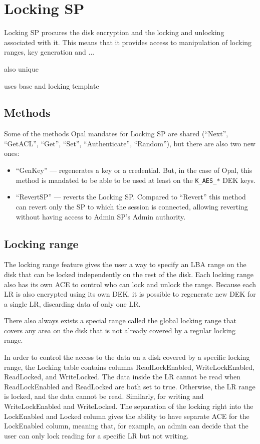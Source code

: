 \section{Locking SP}

Locking SP procures the disk encryption and the locking and unlocking associated with it. This means that it provides access to manipulation of locking ranges, key generation and ...

also unique

uses base and locking template

\subsection{Methods}
Some of the methods Opal mandates for Locking SP are shared (``Next'', ``GetACL'', ``Get'', ``Set'', ``Authenticate'', ``Random''), but there are also two new ones:
\begin{itemize}
\item ``GenKey'' --- regenerates a key or a credential. But, in the case of Opal, this method is mandated to be able to be used at least on the \verb|K_AES_*| DEK keys.
\item ``RevertSP'' --- reverts the Locking SP. Compared to ``Revert'' this method can revert only the SP to which the session is connected, allowing reverting without having access to Admin SP's Admin authority.
\end{itemize}

\subsection{Locking range}

The locking range feature gives the user a way to specify an LBA range on the disk that can be locked independently on the rest of the disk. Each locking range also has its own ACE to control who can lock and unlock the range. Because each LR is also encrypted using its own DEK, it is possible to regenerate new DEK for a single LR, discarding data of only one LR.


There also always exists a special range called the global locking range that covers any area on the disk that is not already covered by a regular locking range.

In order to control the access to the data on a disk covered by a specific locking range, the Locking table contains columns ReadLockEnabled, WriteLockEnabled, ReadLocked, and WriteLocked. The data inside the LR cannot be read when ReadLockEnabled and ReadLocked are both set to true. Otherwise, the LR range is locked, and the data cannot be read. Similarly, for writing and WriteLockEnabled and WriteLocked. The separation of the locking right into the LockEnabled and Locked column gives the ability to have separate ACE for the LockEnabled column, meaning that, for example, an admin can decide that the user can only lock reading for a specific LR but not writing. 

